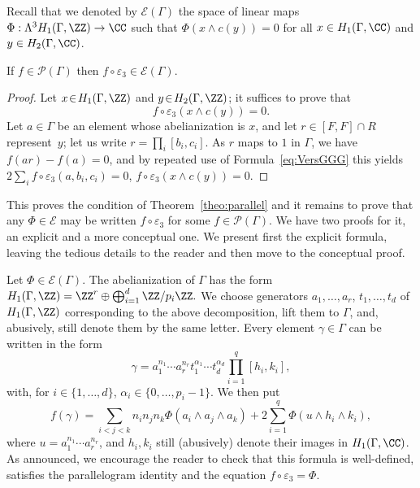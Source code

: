 Recall that we denoted by $\mathcal{E}(\Gamma)$ the space of linear maps
$\Phi:\Lambda^3 H_1(\Gamma,\ZZ)\to \CC$ such that $\Phi(x\wedge c(y))=0$
for all $x\in H_1(\Gamma,\CC)$ and $y\in H_2(\Gamma,\CC)$.

\begin{lemma}\label{H2necessaire}
If $f\in \mathcal{P}(\Gamma)$ then
$f\circ\varepsilon_3\in \mathcal{E}(\Gamma)$.
\end{lemma}
\begin{proof}
Let $x\!\in\!H_1(\Gamma,\ZZ)$ and $y\!\in\!H_2(\Gamma,\ZZ)$; it suffices to prove
that
\[
f\circ\varepsilon_3(x\wedge c(y))=0.
\]
Let $a\in\Gamma$ be an element
whose abelianization is $x$, and let $r\in[F,F]\cap R$ represent~$y$; let us write $r=\prod_i[b_i,c_i]$. As $r$ maps to $1$ in $\Gamma$,
we have $f(ar)-f(a)=0$, and by repeated use of Formula~\eqref{eq:VersGGG}
this yields $2\sum_i f\circ\varepsilon_3(a,b_i,c_i)=0$, \ie 
\hbox{$f\circ\varepsilon_3(x\wedge c(y))=0$}.
\end{proof}

This proves the condition of Theorem~\ref{theo:parallel} and it remains to
prove that any $\Phi\in \mathcal{E}$ may be written $f\circ\varepsilon_3$
for some $f\in\mathcal{P}(\Gamma)$. We have two proofs for it, an explicit
and a more conceptual one. We present first the explicit formula, leaving
the tedious details to the reader and then move to the conceptual proof.

Let $\Phi\in\mathcal{E}(\Gamma)$. The abelianization of $\Gamma$ has the form
$H_1(\Gamma,\ZZ)=\ZZ^r\oplus \bigoplus_{i=1}^d \ZZ/p_i\ZZ.$ We choose generators
$a_1,\ldots,a_r$, $t_1,\ldots,t_d$ of $H_1(\Gamma,\ZZ)$ corresponding to the
above decomposition, lift them to $\Gamma$, and, abusively, still denote them
by the same letter. Every element $\gamma\in\Gamma$ can be written in the form
\begin{equation}\label{ecrireg}
\gamma=a_1^{n_1}\cdots a_r^{n_r}t_1^{\alpha_1}\cdots
t_d^{\alpha_d}\prod_{i=1}^q[h_i,k_i],
\end{equation}
with, for $i\in\{1,\ldots,d\}$, $\alpha_i\in\{0,\ldots,p_i-1\}$. We then put
\begin{equation}
f(\gamma)= \sum_{i<j<k} n_in_jn_k\Phi(a_i\wedge a_j\wedge a_k)
+2\sum_{i=1}^q\Phi(u\wedge h_i\wedge k_i),
\end{equation}
where $u=a_1^{n_1}\cdots a_r^{n_r}$, and $h_i,k_i$ still (abusively) denote
their images in $H_1(\Gamma,\CC)$. As announced, we encourage the reader to
check that this formula is well-defined, satisfies the parallelogram
identity and the equation $f\circ\varepsilon_3=\Phi$.

